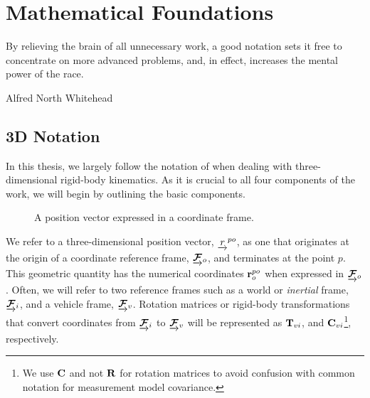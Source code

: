 \chapter{Mathematical Foundations}
\epigraph{By relieving the brain of all unnecessary work, a good notation sets it free to concentrate on more advanced problems, and, in effect, increases the mental power of the race.}{Alfred North Whitehead}
  \section{3D Notation}

In this thesis, we largely follow the notation of \cite{Barfoot2017-ri} when dealing with three-dimensional rigid-body kinematics. As it is crucial to all four components of the work, we will begin by outlining the basic components.

\begin{figure}[h!]
\center
{}
%
%
\caption{A position vector expressed in a coordinate frame.}
\end{figure}

We refer to a three-dimensional position vector, $\underrightarrow{r}^{po}$, as one that originates at the origin of a coordinate reference frame, $\underrightarrow{ \boldsymbol{\mathbf{\mathcal{F}}} }_{o}$, and terminates at the point $p$. This geometric quantity has the numerical coordinates $\boldsymbol{\mathbf{r}}^{po}_o$ when expressed in $\underrightarrow{ \boldsymbol{\mathbf{\mathcal{F}}} }_{o}$. Often, we will refer to two reference frames such as a world or \textit{inertial} frame,  $\underrightarrow{ \boldsymbol{\mathbf{\mathcal{F}}} }_{i}$, and a vehicle frame, $\underrightarrow{ \boldsymbol{\mathbf{\mathcal{F}}} }_{v}$. Rotation matrices or rigid-body transformations that convert coordinates from $\underrightarrow{ \boldsymbol{\mathbf{\mathcal{F}}} }_{i}$ to $\underrightarrow{ \boldsymbol{\mathbf{\mathcal{F}}} }_{v}$ will be represented as $\boldsymbol{\mathbf{T}}_{vi}$, and $\boldsymbol{\mathbf{C}}_{vi}$\footnote{We use $\boldsymbol{\mathbf{C}}$ and not $\boldsymbol{\mathbf{R}}$ for rotation matrices to avoid confusion with common notation for measurement model covariance.}, respectively. 


